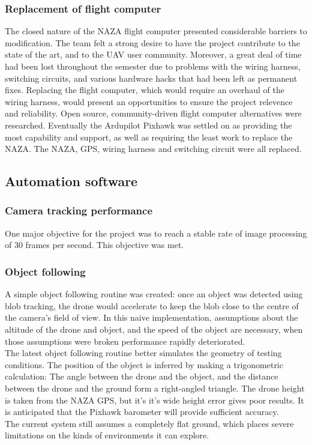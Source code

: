 \documentclass[a4paper, 12pt, titlepage]{article}
\begin{document}
		\subsubsection{Replacement of flight computer}
The closed nature of the NAZA flight computer presented considerable barriers to modification. The team felt a strong desire to have the project contribute to the state of the art, and to the UAV user community. Moreover, a great deal of time had been lost throughout the semester due to problems with the wiring harness, switching circuits, and various hardware hacks that had been left as permanent fixes. Replacing the flight computer, which would require an overhaul of the wiring harness, would present an opportunities to ensure the project relevence and reliability.
Open source, community-driven flight computer alternatives were researched. Eventually the Ardupilot Pixhawk was settled on as providing the most capability and support, as well as requiring the least work to replace the NAZA. The NAZA, GPS, wiring harness and switching circuit were all replaced.



	\subsection{Automation software}

		\subsubsection{Camera tracking performance}
One major objective for the project was to reach a stable rate of image processing of 30 frames per second. This objective was met.

		\subsubsection{Object following}
A simple object following routine was created: once an object was detected using blob tracking, the drone would accelerate to keep the blob close to the centre of the camera’s field of view. In this naive implementation, assumptions about  the altitude of the drone and object, and the speed of the object are necessary, when those assumptions were broken performance rapidly deteriorated.
\\The latest object following routine better simulates the geometry of testing conditions.  The position of the object is inferred by making a trigonometric calculation: The angle between the drone and the object, and the distance between the drone and the ground form a right-angled triangle. The drone height is taken from the NAZA GPS, but it’s it’s wide height error gives poor results. It is anticipated that the Pixhawk barometer will provide sufficient accuracy. 
\\The current system still assumes a completely flat ground, which places severe limitations on the kinds of environments it can explore.
\end{document}
